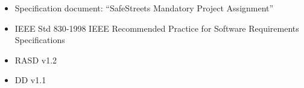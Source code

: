 \begin{itemize}
	\item Specification document: “SafeStreets Mandatory Project Assignment”
	\item IEEE Std 830‐1998 IEEE Recommended Practice for Software Requirements Specifications 
	\item RASD v1.2
	\item DD v1.1
\end{itemize}